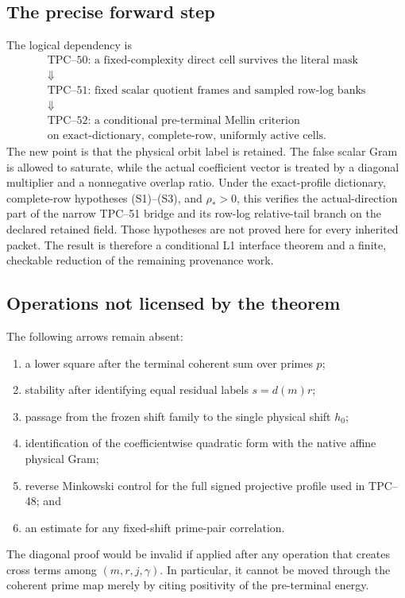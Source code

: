 \subsection{The precise forward step}

The logical dependency is
\begin{equation}
 \begin{gathered}
 \text{TPC--50: a fixed-complexity direct cell survives the literal mask}
 \\
 \Downarrow
 \\
 \text{TPC--51: fixed scalar quotient frames and sampled row-log banks}
 \\
 \Downarrow
 \\
 \boxed{\text{TPC--52: a conditional pre-terminal Mellin criterion}}
 \\
 \boxed{\text{on exact-dictionary, complete-row, uniformly active cells.}}
 \end{gathered}
 \label{eq:tpc52-dependency}
\end{equation}
The new point is that the physical orbit label is retained.  The false
scalar Gram is allowed to saturate, while the actual coefficient vector
is treated by a diagonal multiplier and a nonnegative overlap ratio.
Under the exact-profile dictionary, complete-row hypotheses
\textup{(S1)}--\textup{(S3)}, and \(\rho_*>0\), this verifies the
actual-direction part of the narrow TPC--51 bridge and its row-log
relative-tail branch on the declared retained field.  Those hypotheses are
not proved here for every inherited packet.  The result is therefore a
conditional L1 interface theorem and a finite, checkable reduction of the
remaining provenance work.

\subsection{Operations not licensed by the theorem}

The following arrows remain absent:
\begin{enumerate}[label=\textup{(O\arabic*)},leftmargin=3.2em]
 \item a lower square after the terminal coherent sum over primes \(p\);
 \item stability after identifying equal residual labels
       \(s=d(m)r\);
 \item passage from the frozen shift family to the single physical
       shift \(h_0\);
 \item identification of the coefficientwise quadratic form with the
       native affine physical Gram;
 \item reverse Minkowski control for the full signed projective profile
       used in TPC--48; and
 \item an estimate for any fixed-shift prime-pair correlation.
\end{enumerate}
The diagonal proof would be invalid if applied after any operation that
creates cross terms among \((m,r,j,\gamma)\).  In particular, it cannot
be moved through the coherent prime map merely by citing positivity of
the pre-terminal energy.

